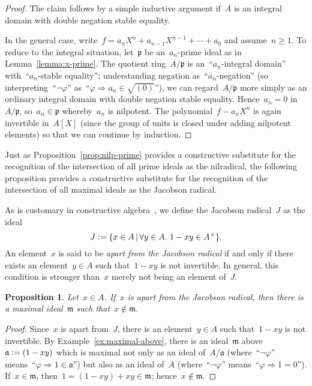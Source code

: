 \documentclass[oneside,reqno]{amsart}
\theoremstyle{definition}
\theoremstyle{plain}
\newtheorem{prop}[defn]{Proposition}
\theoremstyle{remark}
\newcommand{\aaa}{\mathfrak{a}}
\newcommand{\mmm}{\mathfrak{m}}
\newcommand{\ppp}{\mathfrak{p}}
\newcommand{\defeq}{\vcentcolon=}
\renewcommand{\_}{\mathpunct{.}\,}
\begin{document}
\begin{proof}The claim follows by a simple inductive argument if~$A$ is an
integral domain with double negation stable equality.

In the general case, write~$f = a_n X^n + a_{n-1} X^{n-1} + \cdots + a_0$
and assume~$n \geq 1$. To reduce to the integral situation, let~$\ppp$ be
an~$a_n$-prime ideal as in Lemma~\ref{lemma:x-prime}. The quotient
ring~$A/\ppp$ is an~``$a_n$-integral domain'' with~``$a_n$-stable equality'';
understanding negation as~``$a_n$-negation'' (so interpreting~``$\neg\varphi$''
as~``$\varphi \Rightarrow a_n \in \sqrt{(0)}$''), we can regard~$A/\ppp$ more
simply as an ordinary integral domain with double negation stable equality.
Hence~$a_n = 0$ in~$A/\ppp$, so~$a_n \in \ppp$ whereby~$a_n$ is nilpotent. The
polynomial~$f - a_n X^n$ is again invertible in~$A[X]$ (since the group of
units is closed under adding nilpotent elements) so that we can continue by
induction.
\end{proof}

Just as Proposition~\ref{prop:nilp-prime} provides a constructive substitute
for the recognition of the intersection of all prime ideals as the nilradical,
the following proposition provides a constructive substitute for the
recognition of the intersection of all maximal ideals as the Jacobson radical.

As is customary in constructive
algebra~\cite[Section~IX.1]{lombardi-quitte:constructive-algebra}, we define
the Jacobson radical~$J$ as the ideal
\[ J \defeq \{ x \in A \,|\, \forall y \in A\_ 1 - xy \in A^\times \}. \]
An element~$x$ is said to be \emph{apart from the Jacobson radical} if and only if
there exists an element~$y \in A$ such that~$1-xy$ is not invertible. In
general, this condition is stronger than~$x$ merely not being an element of~$J$.

\begin{prop}Let~$x \in A$. If~$x$ is apart from the Jacobson radical, then
there is a maximal ideal~$\mmm$ such that~$x \not\in \mmm$.
\end{prop}

\begin{proof}Since~$x$ is apart from~$J$, there is an element~$y \in A$ such that~$1-xy$
is not invertible. By Example~\ref{ex:maximal-above}, there is an ideal~$\mmm$
above~$\aaa \defeq (1-xy)$ which is maximal not only as an ideal of~$A/\aaa$
(where~``$\neg\varphi$'' means~``$\varphi \Rightarrow 1 \in \aaa$'') but also as an
ideal of~$A$ (where~``$\neg\varphi$'' means~``$\varphi \Rightarrow 1 = 0$''). If~$x
\in \mmm$, then~$1 = (1-xy) + xy \in \mmm$; hence~$x \not\in \mmm$.
\end{proof}
\end{document}
